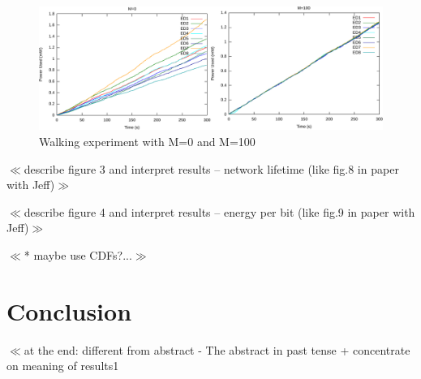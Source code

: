 \documentclass{article}
\begin{document}
\begin{figure}[htb]
\begin{center}
\includegraphics[width=1.0\textwidth]{figures/walk2plots.pdf}
\end{center}
\caption{Walking experiment with M=0 and M=100}
\label{fig:walk2plots}
\end{figure}

$\ll$describe figure  3 and interpret results – network lifetime (like fig.8 in paper with Jeff)$\gg$ 

$\ll$describe figure  4 and interpret results – energy per bit (like fig.9 in paper with Jeff)$\gg$ 

$\ll$* maybe use CDFs?...$\gg$

\section{Conclusion}
$\ll$at the end: different from abstract -  The abstract in past tense + concentrate on meaning of results1

{}

\end{document}
